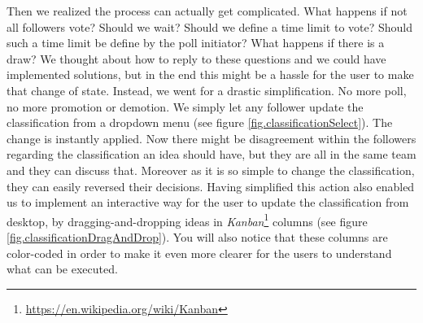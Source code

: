 \documentclass[a4paper,12pt,twoside]{article}
\begin{document}
Then we realized the process can actually get complicated.
What happens if not all followers vote?
Should we wait?
Should we define a time limit to vote? Should such a time limit be define by the poll initiator?
What happens if there is a draw?
We thought about how to reply to these questions and we could have implemented solutions, but in the end this might be a hassle for the user to make that change of state.
Instead, we went for a drastic simplification.
No more poll, no more promotion or demotion.
We simply let any follower update the classification from a dropdown menu (see figure \ref{fig.classificationSelect}).
The change is instantly applied.
Now there might be disagreement within the followers regarding the classification an idea should have, but they are all in the same team and they can discuss that.
Moreover as it is so simple to change the classification, they can easily reversed their decisions.
Having simplified this action also enabled us to implement an interactive way for the user to update the classification from desktop, by dragging-and-dropping ideas in \emph{Kanban}\footnote{\url{https://en.wikipedia.org/wiki/Kanban}} columns (see figure \ref{fig.classificationDragAndDrop}).
You will also notice that these columns are color-coded in order to make it even more clearer for the users to understand what can be executed.
\end{document}
